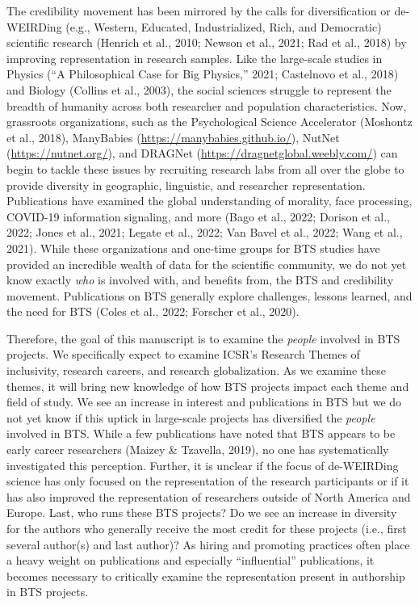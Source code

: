 \documentclass[
  man]{apa7}
\begin{document}
The credibility movement has been mirrored by the calls for
diversification or de-WEIRDing (e.g., Western, Educated, Industrialized,
Rich, and Democratic) scientific research (Henrich et al., 2010; Newson et al., 2021; Rad et al., 2018) by improving representation in research samples. Like the
large-scale studies in Physics ({``A Philosophical Case for Big Physics,''} 2021; Castelnovo et al., 2018) and
Biology (Collins et al., 2003), the social sciences struggle to represent the
breadth of humanity across both researcher and population
characteristics. Now, grassroots organizations, such as the
Psychological Science Accelerator (Moshontz et al., 2018), ManyBabies
(\url{https://manybabies.github.io/}), NutNet (\url{https://nutnet.org/}), and
DRAGNet (\url{https://dragnetglobal.weebly.com/}) can begin to tackle these
issues by recruiting research labs from all over the globe to provide
diversity in geographic, linguistic, and researcher representation.
Publications have examined the global understanding of morality, face
processing, COVID-19 information signaling, and more (Bago et al., 2022; Dorison et al., 2022; Jones et al., 2021; Legate et al., 2022; Van Bavel et al., 2022; Wang et al., 2021). While
these organizations and one-time groups for BTS studies have provided an
incredible wealth of data for the scientific community, we do not yet
know exactly \emph{who} is involved with, and benefits from, the BTS and
credibility movement. Publications on BTS generally explore challenges,
lessons learned, and the need for BTS (Coles et al., 2022; Forscher et al., 2020).

Therefore, the goal of this manuscript is to examine the \emph{people}
involved in BTS projects. We specifically expect to examine ICSR's
Research Themes of inclusivity, research careers, and research
globalization. As we examine these themes, it will bring new knowledge
of how BTS projects impact each theme and field of study. We see an
increase in interest and publications in BTS but we do not yet know if
this uptick in large-scale projects has diversified the \emph{people}
involved in BTS. While a few publications have noted that BTS appears to
be early career researchers (Maizey \& Tzavella, 2019), no one has systematically
investigated this perception. Further, it is unclear if the focus of
de-WEIRDing science has only focused on the representation of the
research participants or if it has also improved the representation of
researchers outside of North America and Europe. Last, who runs these
BTS projects? Do we see an increase in diversity for the authors who
generally receive the most credit for these projects (i.e., first
several author(s) and last author)? As hiring and promoting practices
often place a heavy weight on publications and especially ``influential''
publications, it becomes necessary to critically examine the
representation present in authorship in BTS projects.
\end{document}
